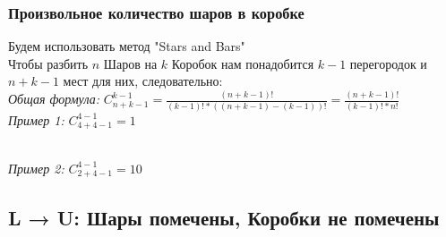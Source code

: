 \documentclass{article}
\begin{document}
            \subsubsection{Произвольное количество шаров в коробке}
                Будем использовать метод "Stars and Bars"\\
                Чтобы разбить $n$ Шаров на $k$ Коробок нам понадобится $k-1$ перегородок и $n+k-1$ мест для них, следовательно:\\
                \textit{Общая формула:} $ C^{k-1}_{n+k-1} = \frac{(n+k-1)!}{(k-1)!*((n+k-1)-(k-1))!} = \frac{(n+k-1)!}{(k-1)!*n!} $\\
                \textit{Пример 1:} $ C^{4-1}_{4+4-1} = 1 $
                \begin{figure}[h!]
                \end{figure}\\
                \textit{Пример 2:} $ C^{4-1}_{2+4-1} = 10 $
                \begin{figure}[h!]
                \end{figure}
        \subsection{L → U: Шары помечены, Коробки не помечены}
\end{document}
